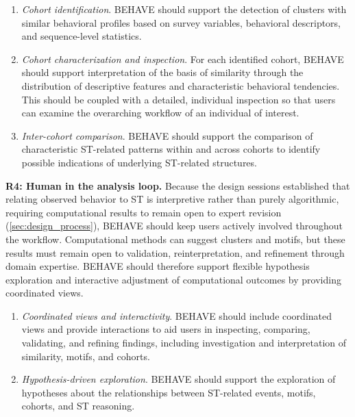 \documentclass[letterpaper,journal]{IEEEtran}
\begin{document}
\begin{enumerate}[label=T\arabic*., start=5, left=0cm, noitemsep, topsep=0pt, parsep=0pt]
    \item \textit{Cohort identification}. 
    \textsc{BEHAVE} should support the detection of clusters with similar behavioral profiles based on survey variables, behavioral descriptors, and sequence-level statistics.

    \item \textit{Cohort characterization and inspection}. 
    For each identified cohort, \textsc{BEHAVE} should support interpretation of the basis of similarity through the distribution of descriptive features and characteristic behavioral tendencies.
    This should be coupled with a detailed, individual inspection so that users can examine the overarching workflow of an individual of interest.

    \item \textit{Inter-cohort comparison}. 
    \textsc{BEHAVE} should support the comparison of characteristic ST-related patterns within and across cohorts to identify possible indications of underlying ST-related structures.
\end{enumerate}

\noindent
\textbf{R4: Human in the analysis loop.}
Because the design sessions established that relating observed behavior to ST is interpretive rather than purely algorithmic, requiring computational results to remain open to expert revision (\cref{sec:design_process}), \textsc{BEHAVE} should keep users actively involved throughout the workflow. 
Computational methods can suggest clusters and motifs, but these results must remain open to validation, reinterpretation, and refinement through domain expertise.
\textsc{BEHAVE} should therefore support flexible hypothesis exploration and interactive adjustment of computational outcomes by providing coordinated views.

\begin{enumerate}[label=T\arabic*., start=8, left=0cm, noitemsep, topsep=0pt, parsep=0pt]
    \item \textit{Coordinated views and interactivity}. 
    \textsc{BEHAVE} should include coordinated views and provide interactions to aid users in inspecting, comparing, validating, and refining findings, including investigation and interpretation of similarity, motifs, and cohorts.

    \item \textit{Hypothesis-driven exploration}. 
    \textsc{BEHAVE} should support the exploration of hypotheses about the relationships between ST-related events, motifs, cohorts, and ST reasoning.
\end{enumerate}
\end{document}
